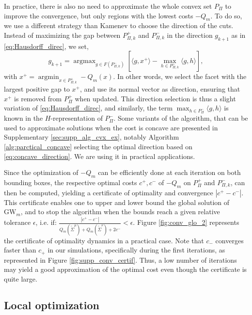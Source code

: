 \documentclass{article}
\newcommand{\1}{\mathbf{1}}
\newcommand{\GW}{\mathrm{GW}}
\DeclareMathOperator*{\argmax}{argmax}
\DeclareMathOperator*{\argmin}{argmin}
\theoremstyle{definition}
\theoremstyle{remark}
\begin{document}
In practice, there is also no need to approximate the whole convex set $P_\Pi$ to improve the convergence, but only regions with the lowest costs $-Q_m$. To do so, we use a different strategy than Kamenev \cite{kamenev1996algorithm} to choose the direction of the cuts. Instead of maximizing the gap between $P_{\Pi,k}^+$ and $P_{\Pi,k}^-$ in the direction $g_{k+1}$ as in \eqref{eq:Hausdorff_direc}, we set,
\begin{equation}\label{eq:concave_direction}
    g_{k+1} = \argmax_{g\in F(P_{\Pi,k}^-)} \left[\langle g,x^+\rangle - \max_{h\in P_{\Pi,k}^-}\langle g,h\rangle\right],
\end{equation}
with $x^+=\argmin_{x\in P_{\Pi,k}^+} -Q_m(x)$. In other words, we select the facet with the largest positive gap to $x^+$, and use its normal vector as direction, ensuring that $x^+$ is removed from $P_{\Pi}^+$ when updated. This direction selection is thus a slight variation of \eqref{eq:Hausdorff_direc}, and similarly, the term $\max_{h\in P_{\Pi}^-}\langle g,h\rangle$ is known in the $H$-representation of $P_{\Pi}^-$.
Some variants of the algorithm, that can be used to approximate solutions when the cost is concave are presented in Supplementary \ref{sec:supp_alg_cvx_ex}, notably Algorithm \ref{alg:parctical_concave} selecting the optimal direction based on \eqref{eq:concave_direction}. We are using it in practical applications. 

Since the optimization of  $-Q_m$ can be efficiently done at each iteration on both bounding boxes, the respective optimal costs  $c^+,c^-$ of $-Q_m$ on $P_{\Pi}^+$ and $P_{\Pi,k}^-$, can then be computed, yielding a certificate of optimality and convergence $|c^+-c^-|$.
This certificate enables one to upper and lower bound the global solution of $\GW_m$, and to stop the algorithm when the bounds reach a given relative tolerance $\epsilon$, i.e. if:
$\frac{|c^+-c^-|}{Q_m(\tilde{\Sigma}^{\mu})+Q_m(\tilde{\Sigma}^{\nu})+2c^-}<\epsilon$. Figure \ref{fig:conv_glo_2} represents the certificate of optimality dynamics in a practical case. Note that $c_-$ converges faster than $c_+$ in our simulations,  specifically during the first iterations, as represented in Figure \ref{fig:supp_conv_certif}. Thus, a low number of iterations may yield a good approximation of the optimal cost even though the certificate is quite large.




\subsection{Local optimization}\label{sec:algo_loc}
\end{document}
